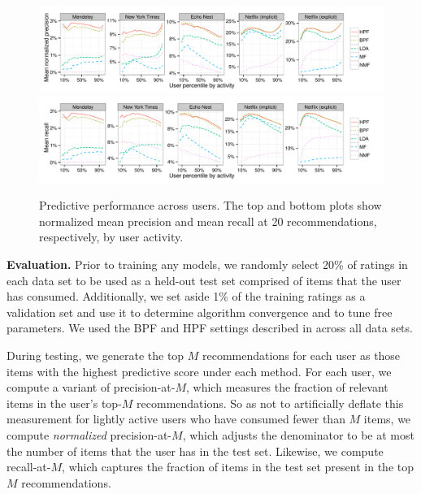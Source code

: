 \begin{figure}[t!]
\centering
\includegraphics[width=\textwidth]{figures/mean_precision_at_20_by_user_percentile.pdf}\\
\includegraphics[width=\textwidth]{figures/mean_recall_at_20_by_user_percentile.pdf}\\
\caption{Predictive performance across users. The top and bottom plots
  show normalized mean precision and mean recall at 20
  recommendations, respectively, by user activity.}
\label{fig:precision_recall_by_user_activity}
\end{figure}

{\bf Evaluation.} Prior to training any models, we randomly select
20\% of ratings in each data set to be used as a held-out test set
comprised of items that the user has consumed. Additionally, we set
aside 1\% of the training ratings as a validation set and use it to
determine algorithm convergence and to tune free parameters. We used
the BPF and HPF settings described in  across all
data sets.

During testing, we generate the top $M$ recommendations for each user
as those items with the highest predictive score under each
method. For each user, we compute a variant of precision-at-$M$, which
measures the fraction of relevant items in the user's top-$M$
recommendations. So as not to artificially deflate this measurement
for lightly active users who have consumed fewer than $M$ items, we
compute {\it normalized} precision-at-$M$, which adjusts the
denominator to be at most the number of items that the user has in the
test set. Likewise, we compute recall-at-$M$, which captures the
fraction of items in the test set present in the top $M$
recommendations.


